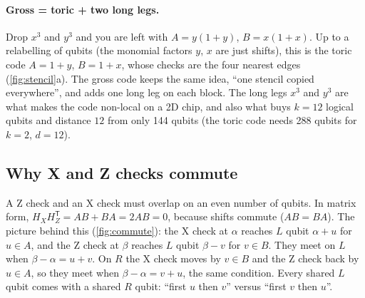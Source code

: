 \documentclass[11pt]{article}
\begin{document}
\paragraph{Gross = toric + two long legs.} Drop $x^3$ and $y^3$ and you are left with
$A = y(1+y)$, $B = x(1+x)$. Up to a relabelling of qubits (the monomial factors $y$, $x$ are just
shifts), this is the toric code $A=1+y$, $B=1+x$, whose checks are the four nearest edges
(\cref{fig:stencil}a). The gross code keeps the same idea, ``one stencil copied
everywhere'', and adds one long leg on each block. The long legs $x^3$ and $y^3$ are what makes the code
non-local on a 2D chip, and also what buys $k=12$ logical qubits and distance $12$ from only
144 qubits (the toric code needs 288 qubits for $k=2$, $d=12$).

\subsection{Why X and Z checks commute}
A Z check and an X check must overlap on an even number of qubits. In matrix form,
$H_X H_Z^{\mathsf T} = AB + BA = 2AB = 0$, because shifts commute ($AB=BA$). The picture
behind this (\cref{fig:commute}): the X check at $\alpha$ reaches $L$ qubit $\alpha+u$ for
$u\in A$, and the Z check at $\beta$ reaches $L$ qubit $\beta-v$ for $v\in B$. They meet on
$L$ when $\beta-\alpha = u+v$. On $R$ the X check moves by $v\in B$ and the Z check back by
$u\in A$, so they meet when $\beta-\alpha = v+u$, the same condition. Every shared $L$ qubit
comes with a shared $R$ qubit: ``first $u$ then $v$'' versus ``first $v$ then $u$''.
\end{document}
